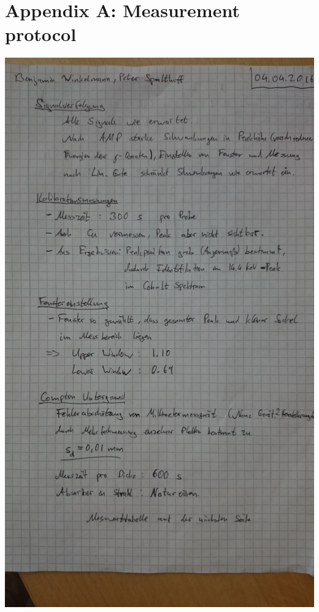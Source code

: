 \section{Appendix A: Measurement protocol}
\includegraphics[angle=-90,width=1.0\linewidth]{graphics/DSC_0098}
\newpage
